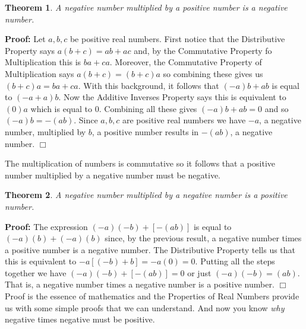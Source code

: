 \documentclass[11pt]{article}
\newtheorem*{theorem}{Theorem}
\newenvironment{highlight}{\begin{hBox}}{\hfill{\color{green!20}}\end{hBox}}
\begin{document}
\begin{tcolorbox}[skin=beamer,beamer,colback=white,colframe=orange!55!black,adjusted title=Theorem]
\begin{theorem}
A negative number multiplied by a positive number is a negative number.
\end{theorem}
\end{tcolorbox}
\noindent\textbf{Proof:} Let $a, b, c$ be positive real numbers. First notice
that the Distributive Property says $a(b+c)=ab+ac$ and, by the Commutative
Property fo Multiplication this is $ba+ca$. Moreover, the Commutative Property
of Multiplication says $a(b+c)=(b+c)a$ so combining these gives us 
$(b+c)a = ba+ca$. With this background, it follows that $(-a)b+ab$ is equal 
to $(-a+a)b$. Now the Additive Inverses Property says this is equivalent to 
$(0)a$ which is equal to $0$. Combining all these gives $(-a)b +ab = 0$
and so $(-a)b = -(ab)$. Since $a, b, c$ are positive real numbers we have 
$-a$, a negative number, multiplied by $b$, a positive number results in 
$-(ab)$, a negative number. $\Box$

\begin{highlight}
The multiplication of numbers is commutative so it follows that 
a positive number multiplied by a negative number must be negative.
\end{highlight}

\begin{tcolorbox}[skin=beamer,beamer,colback=white,colframe=orange!55!black,adjusted title=Theorem]
\begin{theorem}
A negative number multiplied by a negative number is a positive number.
\end{theorem}
\end{tcolorbox}
\noindent\textbf{Proof:} The expression $(-a)(-b)+[-(ab)]$ is equal to 
$(-a)(b)+(-a)(b)$ since, by the previous result, a negative number times a 
positive number is a negative number. The Distributive Property tells
us that this is equivalent to $-a[(-b)+b]=-a(0)=0$. Putting all the steps 
together we have $(-a)(-b)+[-(ab)]=0$ or just $(-a)(-b)=(ab)$. That is, 
a negative number times a negative number is a positive number. $\Box$\\

Proof is the essence of mathematics and the Properties of Real Numbers 
provide us with some simple proofs that we can understand. And now you know 
\emph{why} negative times
negative must be positive.
\end{document}
